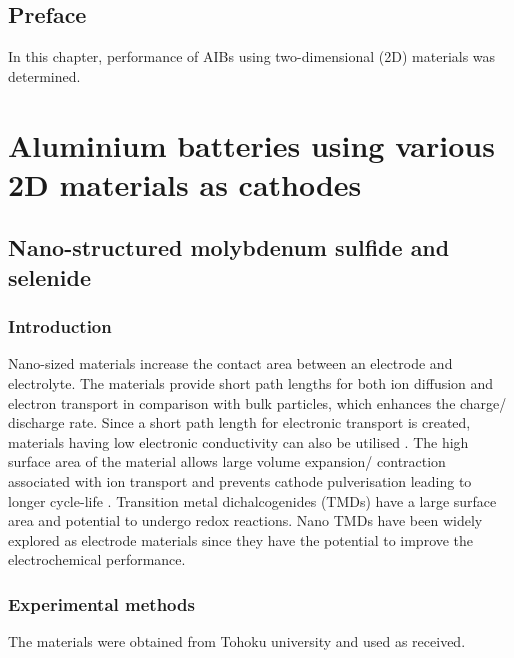\section*{Preface}
In this chapter, performance of AIBs using two-dimensional (2D) materials was determined.
\pagebreak
\chapter{Aluminium batteries using various 2D materials as cathodes} 
\label{chap6} 

\section{Nano-structured molybdenum sulfide  and selenide }

\subsection{Introduction}
Nano-sized materials increase the contact area between an electrode and electrolyte. The materials provide short path lengths for both ion diffusion and electron transport in comparison with bulk particles, which enhances the charge/ discharge rate. Since a short path length for electronic transport is created, materials having low electronic conductivity can also be utilised \cite{pitchai}. The high surface area of the material allows large volume expansion/ contraction associated with ion transport and prevents cathode pulverisation leading to longer cycle-life \cite{zhang_ultrathin, cong_intrinsic_2015}. 
Transition metal dichalcogenides (TMDs) have a large surface area and potential to undergo redox reactions. Nano TMDs have been widely explored as electrode materials since they have the potential to improve the electrochemical performance.  

\subsection{Experimental methods}
The materials were obtained from Tohoku university and used as received. 

